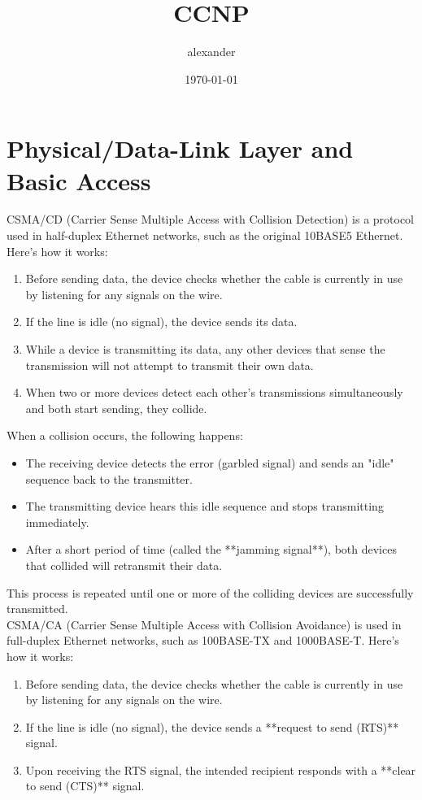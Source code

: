 \documentclass{article}
\title{CCNP}
\author{alexander}
\date{\today}
\begin{document}
\maketitle

\section*{Physical/Data-Link Layer and Basic Access}

CSMA/CD (Carrier Sense Multiple Access with Collision Detection) is a protocol used in half-duplex Ethernet networks, such as the original 10BASE5 Ethernet. Here's how it works:
	\begin{enumerate}
		\item Before sending data, the device checks whether the cable is currently in use by listening for any signals on the wire.
		\item If the line is idle (no signal), the device sends its data.
		\item While a device is transmitting its data, any other devices that sense the transmission will not attempt to transmit their own data.
		\item When two or more devices detect each other's transmissions simultaneously and both start sending, they collide.
	\end{enumerate}

When a collision occurs, the following happens:
	\begin{itemize}
		\item The receiving device detects the error (garbled signal) and sends an "idle" sequence back to the transmitter.
		\item The transmitting device hears this idle sequence and stops transmitting immediately. 
		\item After a short period of time (called the **jamming signal**), both devices that collided will retransmit their data.
	\end{itemize}
This process is repeated until one or more of the colliding devices are successfully transmitted.\\

CSMA/CA (Carrier Sense Multiple Access with Collision Avoidance) is used in full-duplex Ethernet networks, such as 100BASE-TX and 1000BASE-T. Here's how it works:
	\begin{enumerate}
		\item Before sending data, the device checks whether the cable is currently in use by listening for any signals on the wire.
		\item If the line is idle (no signal), the device sends a **request to send (RTS)** signal.
		\item Upon receiving the RTS signal, the intended recipient responds with a **clear to send (CTS)** signal.
	\end{enumerate}
\end{document}
